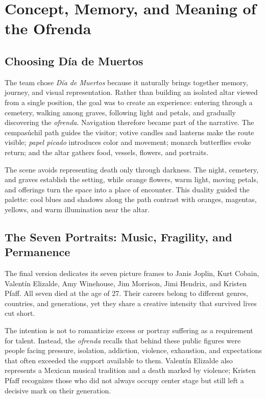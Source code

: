 \documentclass[letter,12pt]{article}
\begin{document}
	\section{Concept, Memory, and Meaning of the Ofrenda}
	\subsection{Choosing Día de Muertos}
	The team chose \textit{Día de Muertos} because it naturally brings together memory, journey, and visual representation. Rather than building an isolated altar viewed from a single position, the goal was to create an experience: entering through a cemetery, walking among graves, following light and petals, and gradually discovering the \textit{ofrenda}. Navigation therefore became part of the narrative. The cempasúchil path guides the visitor; votive candles and lanterns make the route visible; \textit{papel picado} introduces color and movement; monarch butterflies evoke return; and the altar gathers food, vessels, flowers, and portraits.

	The scene avoids representing death only through darkness. The night, cemetery, and graves establish the setting, while orange flowers, warm light, moving petals, and offerings turn the space into a place of encounter. This duality guided the palette: cool blues and shadows along the path contrast with oranges, magentas, yellows, and warm illumination near the altar.

	\subsection{The Seven Portraits: Music, Fragility, and Permanence}
	The final version dedicates its seven picture frames to Janis Joplin, Kurt Cobain, Valentín Elizalde, Amy Winehouse, Jim Morrison, Jimi Hendrix, and Kristen Pfaff. All seven died at the age of 27. Their careers belong to different genres, countries, and generations, yet they share a creative intensity that survived lives cut short.

	The intention is not to romanticize excess or portray suffering as a requirement for talent. Instead, the \textit{ofrenda} recalls that behind these public figures were people facing pressure, isolation, addiction, violence, exhaustion, and expectations that often exceeded the support available to them. Valentín Elizalde also represents a Mexican musical tradition and a death marked by violence; Kristen Pfaff recognizes those who did not always occupy center stage but still left a decisive mark on their generation.
\end{document}
